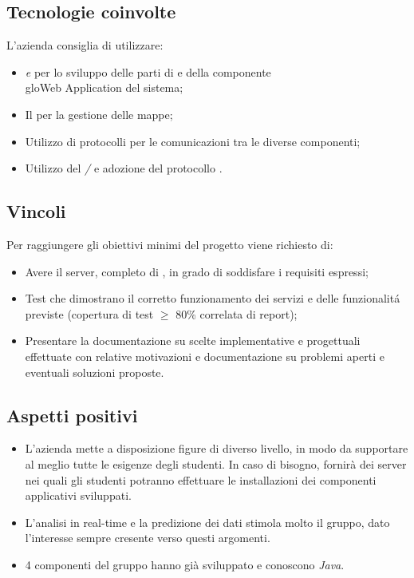 \subsection{Tecnologie coinvolte}
L'azienda consiglia di utilizzare:
\begin{itemize}
	\item \textit{ e } per lo sviluppo delle parti di  e  della componente \\glo{Web Application} del sistema;
	\item Il  \textit{} per la gestione delle mappe;
	\item Utilizzo di protocolli  per le comunicazioni tra le diverse componenti;
	\item Utilizzo del  \textit{/} e adozione del protocollo \textit{}. 
\end{itemize}

\subsection{Vincoli}
Per raggiungere gli obiettivi minimi del progetto viene richiesto di:
\begin{itemize}
	\item Avere il server, completo di , in grado di soddisfare i requisiti espressi;
	\item Test che dimostrano il corretto funzionamento dei servizi e delle funzionalit\'a previste (copertura di test $\geq$ 80\% correlata di report);
	\item Presentare la documentazione su scelte implementative e progettuali effettuate con relative motivazioni e documentazione su problemi aperti e eventuali soluzioni proposte.
\end{itemize}

\subsection{Aspetti positivi}
\begin{itemize}
	\item L'azienda mette a disposizione figure di diverso livello, in modo da supportare al meglio tutte le esigenze degli studenti. In caso di bisogno, fornirà dei server nei quali gli studenti potranno effettuare le installazioni dei componenti applicativi sviluppati.
	\item L'analisi in real-time e la predizione dei dati stimola molto il gruppo, dato l'interesse sempre cresente verso questi argomenti. 
	\item 4 componenti del gruppo hanno già sviluppato e conoscono \textit{Java}.
\end{itemize}

